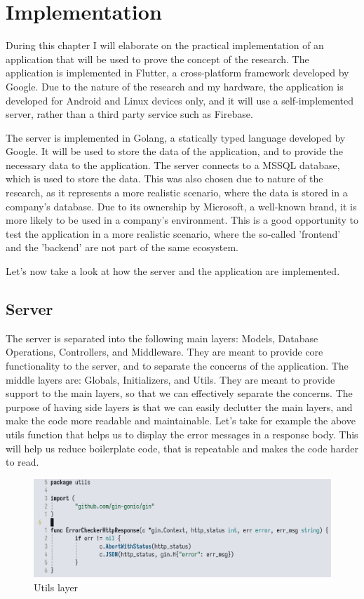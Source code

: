\chapter{Implementation}
During this chapter I will elaborate on the practical implementation of an application that will be used to prove the concept of the research.
The application is implemented in Flutter, a cross-platform framework developed by Google.
Due to the nature of the research and my hardware, the application is developed for Android and Linux devices only, and it will use a self-implemented server,
rather than a third party service such as Firebase.
\par
The server is implemented in Golang, a statically typed language developed by Google.
It will be used to store the data of the application, and to provide the necessary data to the application.
The server connects to a MSSQL database, which is used to store the data. 
This was also chosen due to nature of the research, as it represents a more realistic scenario, where the data is stored in a company's database.
Due to its ownership by Microsoft, a well-known brand, it is more likely to be used in a company's environment.
This is a good opportunity to test the application in a more realistic scenario, where the so-called 'frontend' and the 'backend' are not part of the same ecosystem.

\par
Let's now take a look at how the server and the application are implemented.

\section{Server}
The server is separated into the following main layers: Models, Database Operations, Controllers, and Middleware.
They are meant to provide core functionality to the server, and to separate the concerns of the application.
The middle layers are: Globals, Initializers, and Utils.
They are meant to provide support to the main layers, so that we can effectively separate the concerns. 
The purpose of having side layers is that we can easily declutter the main layers, and make the code more readable and maintainable.
Let's take for example the above utils function that helps us to display the error messages in a response body.
This will help us reduce boilerplate code, that is repeatable and makes the code harder to read.

\begin{figure}[htbp]
    \centering
    \includegraphics[scale=0.4]{pictures/server_utils.png}
    \caption{Utils layer}
    \label{utilsExample}
\end{figure}

